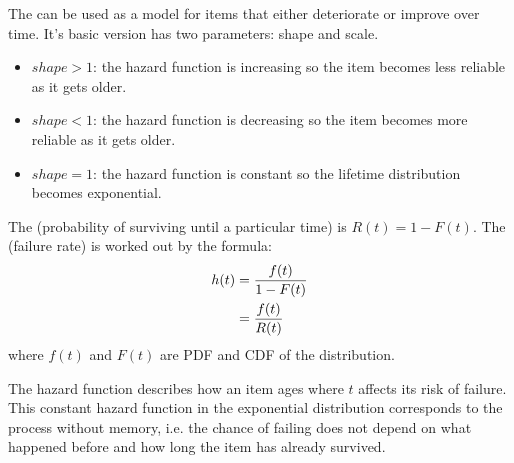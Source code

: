 The  can be used as a model for items that either deteriorate or improve over time. It's basic version has two parameters: shape and scale.
\begin{center}
\end{center}
\begin{itemize}
    \item $shape>1$: the hazard function is increasing so the item becomes less reliable as it gets older.
    \item $shape<1$: the hazard function is decreasing so the item becomes more reliable as it gets older.
    \item $shape=1$: the hazard function is constant so the lifetime distribution becomes exponential.
\end{itemize}

The  (probability of surviving until a particular time) is $R(t) = 1-F(t)$. The  (failure rate) is worked out by the formula:
\begin{align}
    h(t) &= \frac{f(t)}{1-F(t)} \notag \\
    &= \frac{f(t)}{R(t)} \notag
\end{align}
where $f(t)$ and $F(t)$ are PDF and CDF of the distribution.

The hazard function describes how an item ages where $t$ affects its risk of failure. This constant hazard function in the exponential distribution corresponds to the  process without memory, i.e. the chance of failing does not depend on what happened before and how long the item has already survived.